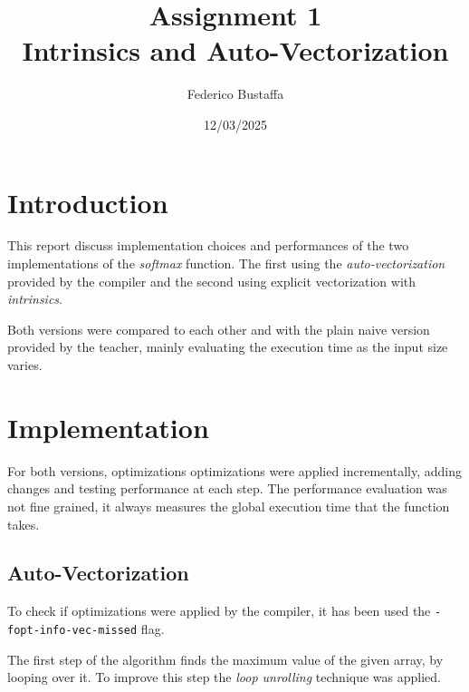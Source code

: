 \documentclass[12pt, a4paper]{article}
\title{Assignment 1\\Intrinsics and Auto-Vectorization}
\author{Federico Bustaffa}
\date{12/03/2025}
\begin{document}
\maketitle
\tableofcontents

\section{Introduction}

This report discuss implementation choices and performances of the two
implementations of the \textit{softmax} function. The first using the
\textit{auto-vectorization} provided by the compiler and the second using
explicit vectorization with \textit{intrinsics}.

Both versions were compared to each other and with the plain naive version
provided by the teacher, mainly evaluating the execution time as the input size
varies.

\section{Implementation}

For both versions, optimizations optimizations were applied incrementally,
adding changes and testing performance at each step. The performance evaluation
was not fine grained, it always measures the global execution time that the
function takes.

\subsection{Auto-Vectorization}

To check if optimizations were applied by the compiler, it has been used the
\verb|-fopt-info-vec-missed| flag.

The first step of the algorithm finds the maximum value of the given array, by
looping over it. To improve this step the \textit{loop unrolling} technique was
applied.
\end{document}

